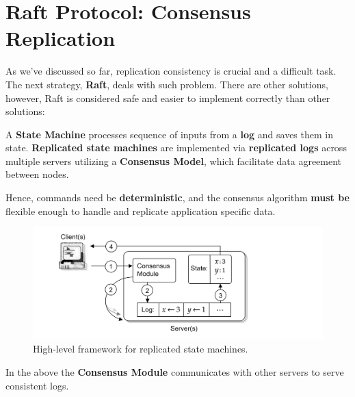 \section{Raft Protocol: Consensus Replication}
As we've discussed so far, replication consistency is crucial and a 
difficult task. The next strategy, \textbf{Raft}, deals with such problem.
There are other solutions, however, Raft is considered safe and easier to 
implement correctly than other solutions:
\begin{Def}
    
    A \textbf{State Machine} processes sequence of inputs from a \textbf{log} and saves them
    in state.
    \textbf{Replicated state machines} are implemented via \textbf{replicated logs} across multiple servers
    utilizing a \textbf{Consensus Model}, which facilitate data agreement between nodes. 
    
    Hence, commands need be \textbf{deterministic}, and the consensus algorithm 
    \textbf{must be} flexible enough to handle and replicate application specific data.
\end{Def}

\vspace{-1.5em}
\begin{figure}[h]
    \centering
    \includegraphics[width=1\textwidth]{Sections/raft/state.png}
    \caption{High-level framework for replicated state machines.}
\end{figure}

\noindent
In the above the \textbf{Consensus Module} communicates with other servers to serve consistent logs. 

\newpage 
